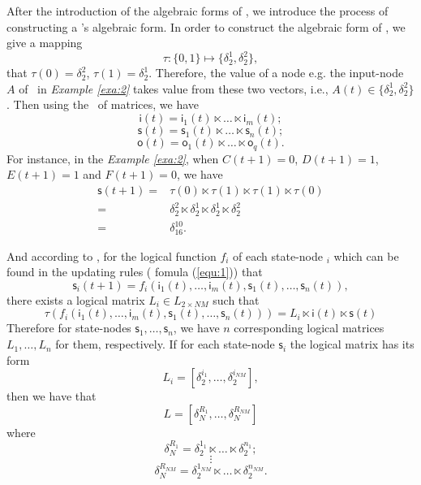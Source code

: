After the introduction of the algebraic forms of \BCNs, we introduce the process of constructing a \BCN's  algebraic form. In order to construct the algebraic form of \BCN, we give a mapping \[\tau:\{0,1\}\mapsto \{\delta_2^1, \delta_2^2\},\] that $\tau(0)=\delta_2^2$, $\tau(1)= \delta_2^1$. 
Therefore, the value of a node e.g. the input-node $A$ of \BCN\ in {\em Example \ref{exa:2}} takes value from these two vectors, i.e., $A(t)\in \{\delta_2^1, \delta_2^2\}$. Then using the \STP\ of matrices, we have 
\[\mathsf{i}(t)=\mathsf{i}_1(t)\ltimes {\ldots}\ltimes \mathsf{i}_m(t);\] 
\[\mathsf{s}(t)=\mathsf{s}_1(t)\ltimes {\ldots}\ltimes \mathsf{s}_n(t);\] 
\[\mathsf{o}(t)=\mathsf{o}_1(t)\ltimes {\ldots}\ltimes \mathsf{o}_q(t).\] 
For instance, in the {\em Example \ref{exa:2}}, when $C(t+1)=0$, $D(t+1)=1$, $E(t+1)=1$ and $F(t+1)=0$, we have 
\begin{equation*}
\begin{split}
\mathsf{s}(t+1)=&\tau(0) \ltimes \tau(1) \ltimes \tau(1) \ltimes \tau(0)\\
=&\delta_{2}^2 \ltimes \delta_{2}^1 \ltimes \delta_{2}^1 \ltimes \delta_{2}^2\\
=&\delta_{16}^{10}.
\end{split}
\end{equation*}

And according to \cite{Cheng2003Semi}, for the logical function $f_i$ of each state-node \State$_i$ which can be found in the updating rules ( fomula (\ref{equ:1})) that
\[\mathsf{s}_i(t+1)=f_i(\mathsf{i}_1(t),\ldots,\mathsf{i}_m(t),\mathsf{s}_1(t),\ldots,\mathsf{s}_n(t)),\] 
there exists a logical matrix $L_i\in L_{2\times {N M}}$ such that
\[\tau(f_i(\mathsf{i}_1(t),\ldots,\mathsf{i}_m(t),\mathsf{s}_1(t),\ldots,\mathsf{s}_n(t)))= L_i\ltimes\mathsf{i}(t)\ltimes\mathsf{s}(t)\]
Therefore for state-nodes $\mathsf{s}_1,\ldots,\mathsf{s}_n$, we have $n$ corresponding logical matrices $L_1,\ldots,L_n$ for them, respectively. 
If for each state-node $\mathsf{s}_i$ the logical matrix has its form
\[L_i=[\delta_2^{i_1},\ldots,\delta_2^{i_{NM}}],\] 
then we have that %
\[L=[\delta_N^{R_1},\ldots,\delta_N^{R_{NM}}]\]  where 
\[\delta_N^{R_1}=\delta_2^{1_1}\ltimes \ldots \ltimes \delta_2^{n_1};\]\[\vdots\] \[\delta_N^{R_{NM}}=\delta_2^{1_{NM}}\ltimes \ldots \ltimes \delta_2^{n_{NM}}.\] 


